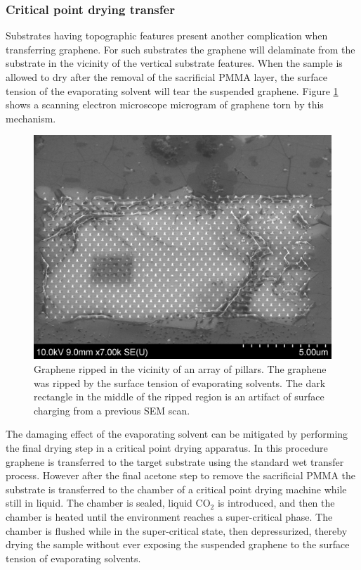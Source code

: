 \documentclass[edeposit,fullpage,draftthesis]{uiucthesis2009}
\begin{document}
            \subsubsection{Critical point drying transfer}
            
        Substrates having topographic features present another complication when transferring graphene.
        For such substrates the graphene will delaminate from the substrate in the vicinity of the 
        vertical substrate features. When the sample is allowed to dry
        after the removal of the sacrificial PMMA layer, the surface tension of the evaporating solvent will tear
        the suspended graphene. Figure \ref{fig:cpdtear} shows a scanning electron microscope microgram of 
        graphene torn by this mechanism.
        
        \begin{figure}
            \centering
            \includegraphics[width=0.5\linewidth]{images/experimentaltechniques/cpdtear.png}
            \caption[Graphene tears from solvent surface tension]{
                Graphene ripped in the vicinity of an array of pillars. The graphene 
                was ripped by the surface tension
                of evaporating solvents. The dark rectangle in the middle of the ripped region
                is an artifact of surface charging from a previous SEM scan.
                }
            \label{fig:cpdtear}
        \end{figure}

        The damaging effect of the evaporating solvent can be mitigated by performing the final
        drying step in a critical point drying apparatus. In this procedure graphene
        is transferred to the target substrate using the standard wet transfer process. 
        However after the 
        final acetone step to remove the sacrificial PMMA the substrate is transferred
        to the chamber of a critical point drying machine while still in liquid.
        The chamber is sealed, liquid CO$_2$ is introduced, and then the chamber is heated until the environment 
        reaches a super-critical phase. The chamber is flushed while in the super-critical state,
        then depressurized, thereby drying the sample without ever exposing the suspended graphene 
        to the surface tension of evaporating solvents.
            
\end{document}

